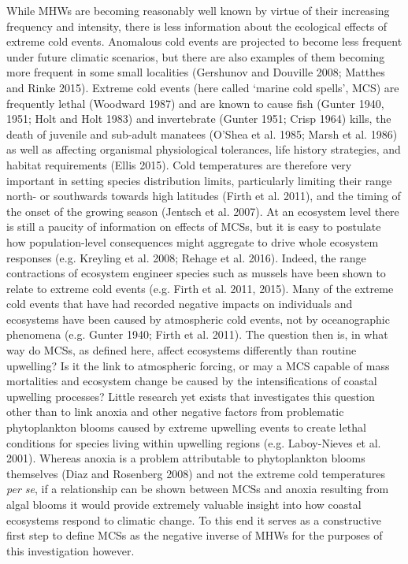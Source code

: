 \documentclass[a4paper,10pt,review]{elsarticle}
\begin{document}
While MHWs are becoming reasonably well known by virtue of their increasing frequency and intensity, there is less information about the ecological effects of extreme cold events. Anomalous cold events are projected to become less frequent under future climatic scenarios, but there are also examples of them becoming more frequent in some small localities (Gershunov and Douville 2008; Matthes and Rinke 2015). Extreme cold events (here called ‘marine cold spells’, MCS) are frequently lethal (Woodward 1987) and are known to cause fish (Gunter 1940, 1951; Holt and Holt 1983) and invertebrate (Gunter 1951; Crisp 1964) kills, the death of juvenile and sub-adult manatees (O'Shea et al. 1985; Marsh et al. 1986) as well as affecting organismal physiological tolerances, life history strategies, and habitat requirements (Ellis 2015). Cold temperatures are therefore very important in setting species distribution limits, particularly limiting their range north- or southwards towards high latitudes (Firth et al. 2011), and the timing of the onset of the growing season (Jentsch et al. 2007). At an ecosystem level there is still a paucity of information on effects of MCSs, but it is easy to postulate how population-level consequences might aggregate to drive whole ecosystem responses (e.g. Kreyling et al. 2008; Rehage et al. 2016). Indeed, the range contractions of ecosystem engineer species such as mussels have been shown to relate to extreme cold events (e.g. Firth et al. 2011, 2015). Many of the extreme cold events that have had recorded negative impacts on individuals and ecosystems have been caused by atmospheric cold events, not by oceanographic phenomena (e.g. Gunter 1940; Firth et al. 2011). The question then is, in what way do MCSs, as defined here, affect ecosystems differently than routine upwelling? Is it the link to atmospheric forcing, or may a MCS capable of mass mortalities and ecosystem change be caused by the intensifications of coastal upwelling processes? Little research yet exists that investigates this question other than to link anoxia and other negative factors from problematic phytoplankton blooms caused by extreme upwelling events to create lethal conditions for species living within upwelling regions (e.g. Laboy-Nieves et al. 2001). Whereas anoxia is a problem attributable to phytoplankton blooms themselves (Diaz and Rosenberg 2008) and not the extreme cold temperatures \textit{per se}, if a relationship can be shown between MCSs and anoxia resulting from algal blooms it would provide extremely valuable insight into how coastal ecosystems respond to climatic change. To this end it serves as a constructive first step to define MCSs as the negative inverse of MHWs for the purposes of this investigation however.
\end{document}
